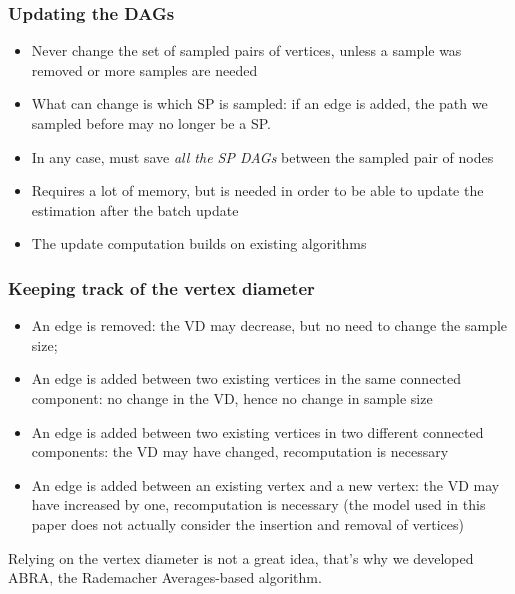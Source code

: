 \begin{frame}
  \frametitle{Updating the DAGs}
  \begin{itemize}
    \item Never change the set of sampled pairs of vertices, unless a sample was removed
      or more samples are needed
    \item What can change is which SP is sampled: if an edge is added, the path
      we sampled before may no longer be a SP.
      \pause
    \item In any case, must save \emph{all the SP DAGs} between the sampled
      pair of nodes
      \pause
    \item Requires a lot of memory, but is needed in order to be able to update
      the estimation after the batch update
    \item The update computation builds on existing algorithms
  \end{itemize}
\end{frame}

\begin{frame}
  \frametitle{Keeping track of the vertex diameter}
  \begin{itemize}
    \item An edge is removed: the VD may decrease, but no need to change the
      sample size;
    \pause
    \item An edge is added between two existing vertices in the same connected
      component: no change in the VD, hence no change in sample size
    \pause
    \item An edge is added between two existing vertices in two different
      connected components: the VD may have changed, recomputation is necessary
    \pause
    \item An edge is added between an existing vertex and a new vertex: the VD
      may have increased by one, recomputation is necessary (the model used in
      this paper does not actually consider the insertion and removal of
      vertices)
  \end{itemize}
  \pause
  Relying on the vertex diameter is not a great idea, that's why we developed
  ABRA, the Rademacher Averages-based algorithm.
\end{frame}

